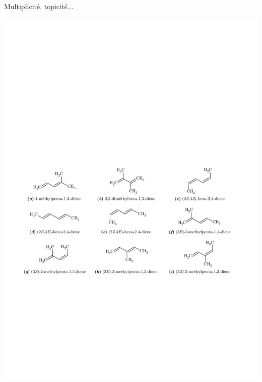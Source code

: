 \begin{center}
\end{center}

\begin{solution}
\begin{questions}
    \questioncours Multiplicité, topicité...
    
    \question 
    \includegraphics[width=.99\linewidth]{chimiePC/orga/RMN_sols.pdf}
\end{questions}
\end{solution}
